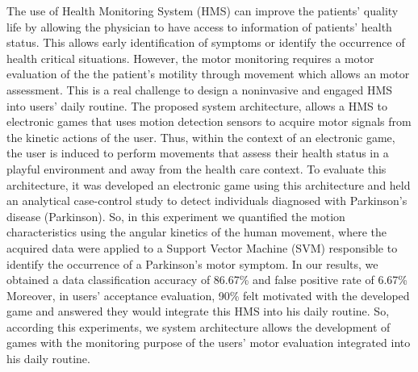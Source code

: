 The use of Health Monitoring System (HMS) can improve the patients' quality life by allowing the physician to have access to information of patients' health status. This allows early identification of symptoms or identify the occurrence of health critical situations. However, the motor monitoring requires a motor evaluation of the the patient's motility through movement which allows an motor assessment. This is a real challenge to design a noninvasive and engaged HMS into users' daily routine.
The proposed system architecture, allows a HMS to electronic games that uses motion detection sensors to acquire motor signals from the kinetic actions of the user. Thus, within the context of an electronic game, the user is induced to perform movements that assess their health status in a playful environment and away from the health care context. To evaluate this architecture, it was developed an electronic game using this architecture and held an analytical case-control study to detect individuals diagnosed with Parkinson's disease (Parkinson). So, in this experiment we quantified the motion characteristics using the angular kinetics of the human movement, where the acquired data were applied to a Support Vector Machine (SVM) responsible to identify the occurrence of a Parkinson's motor symptom. In our results, we obtained a data classification accuracy of 86.67\% and false positive rate of 6.67\% Moreover, in users' acceptance evaluation, 90\% felt motivated with the developed game and 
answered they would integrate this HMS into his daily routine. So, according this experiments, we system architecture allows the development of games with the monitoring purpose of the users' motor evaluation integrated into his daily routine.



